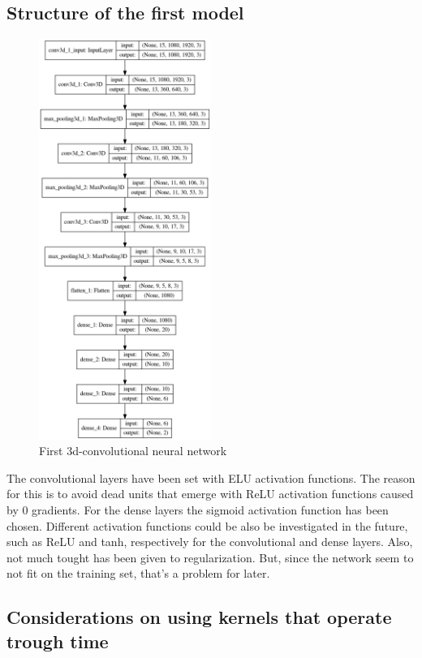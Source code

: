 \documentclass{article}
\begin{document}
\subsection{Structure of the first model}

\begin{figure}[h]
\caption{First 3d-convolutional neural network}
\centering
\includegraphics[width=0.5\textwidth]{first_model.png}
\end{figure}

The convolutional layers have been set with ELU activation functions.
The reason for this is to avoid dead units that emerge with ReLU activation functions
caused by 0 gradients.
For the dense layers the sigmoid activation function has been chosen.
Different activation functions could be also be investigated in the future,
such as ReLU and tanh, respectively for the convolutional and dense layers.
Also, not much tought has been given to regularization. But, since the network
seem to not fit on the training set, that's a problem for later.

\subsection{Considerations on using kernels that operate trough time}
\end{document}
